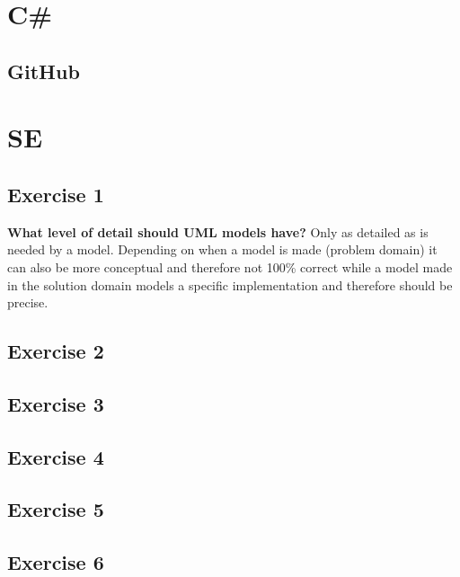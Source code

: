 \documentclass{article}
\begin{document}
\section*{C#}
\subsection*{GitHub}

\section*{SE}
\subsection*{Exercise 1}
\textbf{What level of detail should UML models have?}
Only as detailed as is needed by a model.
Depending on when a model is made (problem domain) it can also be more conceptual and therefore not 100\% correct while a model made in the solution domain models a specific implementation and therefore should be precise.

\subsection*{Exercise 2}
\subsection*{Exercise 3}
\subsection*{Exercise 4}
\subsection*{Exercise 5}
\subsection*{Exercise 6}
\end{document}

